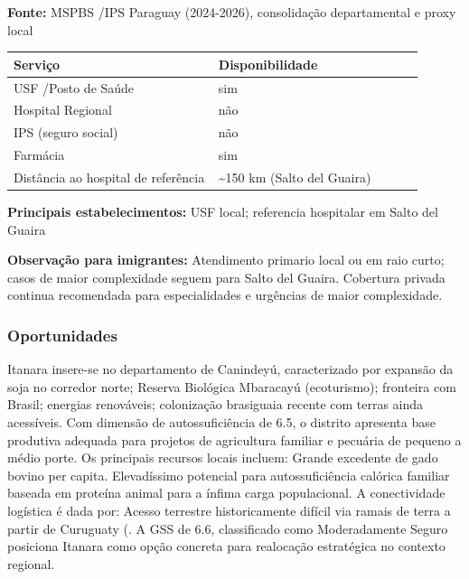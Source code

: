 \textbf{Fonte:} MSPBS /\allowbreak  IPS Paraguay (2024-2026), consolidação
departamental e proxy local

{\def\LTcaptype{none} %
\begin{longtable}{@{}>{\raggedright\arraybackslash}p{0.45\linewidth} >{\raggedright\arraybackslash}p{0.45\linewidth}@{}}
\toprule\noalign{}
Serviço & Disponibilidade \\
\midrule\noalign{}
\endhead
\bottomrule\noalign{}
\endlastfoot
USF /\allowbreak  Posto de Saúde & sim \\
Hospital Regional & não \\
IPS (seguro social) & não \\
Farmácia & sim \\
Distância ao hospital de referência & \textasciitilde150 km (Salto del
Guaira) \\
\end{longtable}
}

\textbf{Principais estabelecimentos:} USF local; referencia hospitalar
em Salto del Guaira

\textbf{Observação para imigrantes:} Atendimento primario local ou em
raio curto; casos de maior complexidade seguem para Salto del Guaira.
Cobertura privada continua recomendada para especialidades e urgências
de maior complexidade.
\newpage

\subsubsection*{Oportunidades}\label{oport-itanara-1405}
Itanara insere-se no departamento de Canindeyú, caracterizado por expansão da soja no corredor norte; Reserva Biológica Mbaracayú (ecoturismo); fronteira com Brasil; energias renováveis; colonização brasiguaia recente com terras ainda acessíveis. Com dimensão de autossuficiência de 6.5, o distrito apresenta base produtiva adequada para projetos de agricultura familiar e pecuária de pequeno a médio porte. Os principais recursos locais incluem: Grande excedente de gado bovino per capita. Elevadíssimo potencial para autossuficiência calórica familiar baseada em proteína animal para a ínfima carga populacional. A conectividade logística é dada por: Acesso terrestre historicamente difícil via ramais de terra a partir de Curuguaty (. A GSS de 6.6, classificado como Moderadamente Seguro posiciona Itanara como opção concreta para realocação estratégica no contexto regional.

